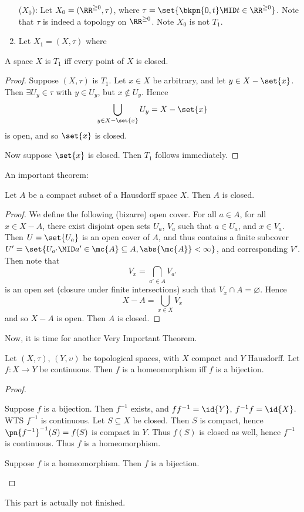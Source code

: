 \documentclass{fkbook}
\theoremstyle{snazzydefinition}
\begin{document}
\begin{adjustwidth}{1em}{1em}
\begin{enumerate}[label=($X_\arabic*)$:]
    \item[($X_0$):] Let $X_0 = (\RR^{\geq 0}, \tau)$, where $\tau =
      \set{\bkpn{0,t} \MID t \in \RR^{\geq 0}}$. Note that $\tau$ is
      indeed a topology on $\RR^{\geq 0}$. Note $X_0$ is not $T_1$.
    \item Let $X_1 = (X, \tau)$ where
  \end{enumerate}
  \begin{theorem}
    A space $X$ is $T_1$ iff every point of $X$ is closed.
  \end{theorem}
  \begin{proof}
    Suppose $(X, \tau)$ is $T_1$. Let $x \in X$ be arbitrary, and let
    $y \in X- \set{x}$. Then $\exists U_y \in \tau$ with $y \in U_y$,
    but $x \not \in U_y$. Hence
    \[
      \bigcup_{y \in X - \set{x}} U_y = X - \set{x}
    \]
    is open, and so $\set{x}$ is closed.

    Now suppose $\set{x}$ is closed. Then $T_1$ follows immediately.
  \end{proof}
  An important theorem:
  \begin{theorem}
    Let $A$ be a compact subset of a Hausdorff space $X$. Then $A$ is
    closed.
  \end{theorem}
  \begin{proof}
    We define the following (bizarre) open cover. For all $a \in A$,
    for all $x \in X - A$, there exist disjoint open sets $U_a$, $V_a$
    such that $a \in U_a$, and $x \in V_a$. Then $U = \set{U_a}$ is an
    open cover of $A$, and thus contains a finite subcover $U' =
    \set{U_{a'} \MID a' \in \mc{A} \subseteq A, \abs{\mc{A}} <
      \infty}$, and corresponding $V'$. Then note that
    \[
      V_x = \bigcap_{a' \in A} V_{a'}
    \]
    is an open set (closure under finite intersections) such that $V_x
    \cap A = \varnothing$. Hence
    \[
      X - A = \bigcup_{x \in X} V_x
    \]
    and so $X - A$ is open. Then $A$ is closed.
  \end{proof}
  Now, it is time for another Very Important Theorem\texttrademark.
  \begin{theorem}
    Let $(X, \tau)$, $(Y, \upsilon)$ be topological spaces, with $X$
    compact and $Y$ Hausdorff. Let $f : X \to Y$ be continuous. Then
    $f$ is a homeomorphism iff $f$ is a bijection.
  \end{theorem}
  \begin{proof}~
    \begin{iffproof}
      \item Suppose $f$ is a bijection. Then $f^{-1}$ exists, and
        $ff^{-1} = \id{Y}$, $f^{-1}f = \id{X}$. WTS $f^{-1}$ is
        continuous. Let $S \subseteq X$ be closed. Then $S$ is
        compact, hence $\pn{f^{-1}}^{-1}(S) = f(S)$ is compact in $Y$.
        Thus $f(S)$ is closed as well, hence $f^{-1}$ is continuous.
        Thus $f$ is a homeomorphism.
      \item Suppose $f$ is a homeomorphism. Then $f$ is a bijection.
    \end{iffproof}
  \end{proof}
  This part is actually not finished.

\end{adjustwidth}
\end{document}

